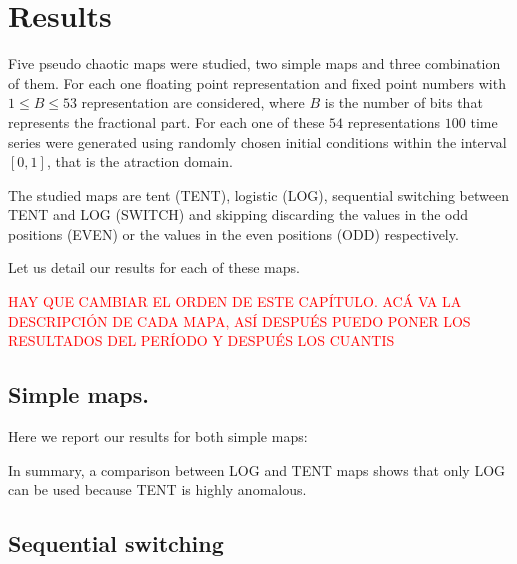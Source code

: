\section{Results}\label{sec:resultados}

Five pseudo chaotic maps were studied, two simple maps and three combination of them.
For each one floating point representation and fixed point numbers with $1\leq B \leq 53$ representation are considered, where $B$ is the number of bits that represents the fractional part.
For each one of these $54$ representations $100$ time series were generated using randomly chosen initial conditions within the interval $[0,1]$, that is the atraction domain.

The studied maps are tent (TENT), logistic (LOG), sequential switching between TENT and LOG (SWITCH) and skipping discarding the values in the odd positions (EVEN) or the values in the even positions (ODD) respectively.

Let us detail our results for each of these maps.

\textcolor{red}{HAY QUE CAMBIAR EL ORDEN DE ESTE CAPÍTULO. ACÁ VA LA DESCRIPCIÓN DE CADA MAPA, ASÍ DESPUÉS PUEDO PONER LOS RESULTADOS DEL PERÍODO Y DESPUÉS LOS CUANTIS}

\subsection {Simple maps.}\label{subsec:SimpleMaps}
Here we report our results for both simple maps:





In summary, a comparison between LOG and TENT maps shows that only LOG  can be used because TENT is highly anomalous. 

\subsection{Sequential switching}\label{subsec:SecSwitch}





